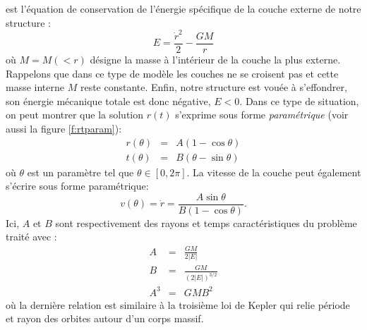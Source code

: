  est l'équation de conservation de l'énergie spécifique de la couche externe de notre structure :
\begin{equation}
E=\frac{\dot r^2}{2}-\frac{GM}{r}
\end{equation}
où $M=M(<r)$ désigne la masse à l'intérieur de la couche la plus externe. Rappelons que dans ce type de modèle les couches ne se croisent pas  et cette masse interne $M$ reste constante. Enfin, notre structure est vouée à s'effondrer, son énergie mécanique totale est donc négative, $E<0$. Dans ce type de situation, on peut montrer que la solution $r(t)$ s'exprime sous forme \textit{paramétrique} (voir aussi la figure \ref{f:rtparam}):
\begin{eqnarray}
r(\theta)&=&A (1-\cos \theta)\\
t(\theta)&=&B (\theta-\sin \theta)
\end{eqnarray}
où $\theta$ est un paramètre tel que $\theta \in [0,2\pi]$. La vitesse de la couche peut également s'écrire sous forme paramétrique:
\begin{equation}
v(\theta)=\dot r= \frac{A \sin \theta}{B(1-\cos \theta)}.
\end{equation}
Ici, $A$ et $B$ sont respectivement des rayons et temps caractéristiques du problème traité avec :
\begin{eqnarray}
A&=&\frac{GM}{2|E|}\\
B&=&\frac{GM}{(2|E|)^{3/2}}\\
A^3&=&GM B^2
\end{eqnarray}
où la dernière relation est similaire à la troisième loi de Kepler qui relie période et rayon des orbites autour d'un corps massif.


